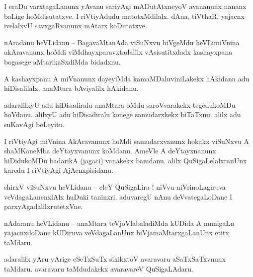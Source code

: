\documentclass{article}
\begin{document}
\begin{mn}%
I eraDu varxtagaLanunx yAvanu sariyAgi mADutAtxneyoV avananunx nananx baLige hoMdisutatxve. I 
riVtiyAdudu matotxMdilalx. dAna, tiVthaR, yajacnx ivelalxvU savxgaRvanunx mAtarx koDutatxve.
\end{mn}


\begin{mn}%
nAradanu heVLidanu -- BagavaMtanAda viSuNxvu hiVgeMdu heVLimiVnina akAravanunx hoMdi 
viMdhayxparavxtadalilx vAsisutitxdadx kashayxpana bogasege aMtarikaSxdiMda bidadxnu.
\end{mn}

\begin{mn}%
A kashayxpanu A miVnanunx dayeyiMda kamaMDaluviniLakekx hAkidanu adu hiDisalilalx. anaMtara 
bAviyalilx hAkidanu.
\end{mn}

\begin{mn}%
adaralilxyU adu hiDisadiralu anaMtara oMdu saroVvarakekx tegedukoMDu hoVdanu. alilxyU adu 
hiDisadiralu konege samudarxkekx biTaTxnu. alilx adu suKavAgi beLeyitu.
\end{mn}

\begin{mn}%
I riVtiyAgi miVnina AkAravanunx hoMdi samudarxvanunx hokakx viSuNxvu A shaMKaneMba deYtayxvanunx 
koMdanu. AmeVle A deYtayxnanunx hiDidukoMDu badarikA (jagaci) vanakekx bamdanu. alilx 
QuSigaLelalxranUnx karedu I riVtiyAgi AjAcnxpisidanu.
\end{mn}

\begin{mn}%
shirxV viSuNxvu heVLidanu -- eleY QuSigaLira ! niVvu niVrinoLagiruva veVdagaLanenxlAlx huDuki 
taninxri. aduvaregU nAnu deVvategaLoDane I parxyAgadalilxrutetxVne.
\end{mn}

\begin{mn}%
nAdaranu heVLidanu -- anaMtara teVjoVlabaladiMda kUDida A munigaLu yajacnxdoDane kUDiruva 
veVdagaLanUnx biVjamaMtarxgaLanUnx etitx taMdaru.
\end{mn}

\begin{mn}%
adaralilx yAru yArige eSeTxSuTx sikikxtoV avaravaru aSaTxSaTxvnunx taMdaru. avaravaru taMdudakekx 
avaravareV QuSigaLAdaru.
\end{mn}
\end{document}
